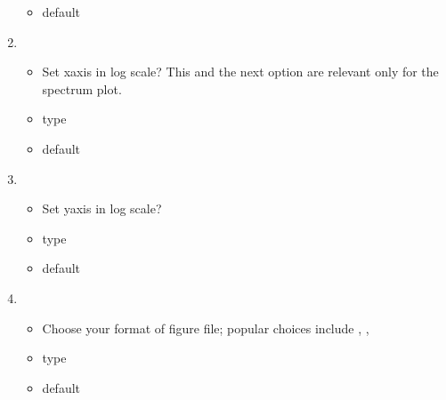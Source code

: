 \documentclass[letterpaper,10pt,english]{sphinxmanual}
\begin{document}
\begin{enumerate}
\begin{itemize}
\item {} 
\sphinxAtStartPar
default 

\end{itemize}

\item {} 
\sphinxAtStartPar
{}
\begin{itemize}
\item {} 
\sphinxAtStartPar
Set x\sphinxhyphen{}axis in log scale? This and the next option are relevant
only for the spectrum plot.

\item {} 
\sphinxAtStartPar
type 

\item {} 
\sphinxAtStartPar
default 

\end{itemize}

\item {} 
\sphinxAtStartPar
{}
\begin{itemize}
\item {} 
\sphinxAtStartPar
Set y\sphinxhyphen{}axis in log scale?

\item {} 
\sphinxAtStartPar
type 

\item {} 
\sphinxAtStartPar
default 

\end{itemize}

\item {} 
\sphinxAtStartPar
{}
\begin{itemize}
\item {} 
\sphinxAtStartPar
Choose your format of figure file; popular choices include
, , 

\item {} 
\sphinxAtStartPar
type 

\item {} 
\sphinxAtStartPar
default 

\end{itemize}

\end{enumerate}
\end{document}
